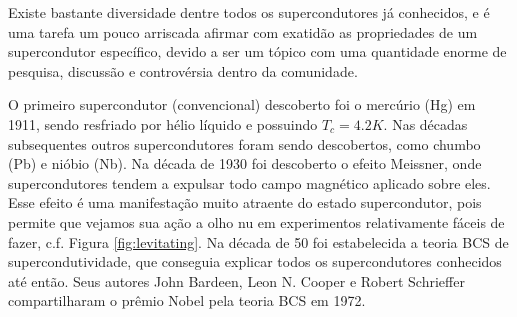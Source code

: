 \documentclass[a4paper,10pt]{article}
\begin{document}
Existe bastante diversidade dentre todos os supercondutores já conhecidos, e é uma tarefa um pouco arriscada afirmar com exatidão as propriedades de um supercondutor específico, devido a ser um tópico com uma quantidade enorme de pesquisa, discussão e controvérsia dentro da comunidade.

O primeiro supercondutor (convencional) descoberto foi o mercúrio (Hg) em 1911, sendo resfriado por hélio líquido e possuindo $T_c = 4.2 \unit{K}$. Nas décadas subsequentes outros supercondutores foram sendo descobertos, como chumbo (Pb) e nióbio (Nb). Na década de 1930 foi descoberto o efeito Meissner, onde supercondutores tendem a expulsar todo campo magnético aplicado sobre eles. Esse efeito é uma manifestação muito atraente do estado supercondutor, pois permite que vejamos sua ação a olho nu em experimentos relativamente fáceis de fazer, c.f. Figura \ref{fig:levitating}. Na década de 50 foi estabelecida a teoria BCS de supercondutividade, que conseguia explicar todos os supercondutores conhecidos até então. Seus autores John Bardeen, Leon N. Cooper e Robert Schrieffer compartilharam o prêmio Nobel pela teoria BCS em 1972.
\end{document}
